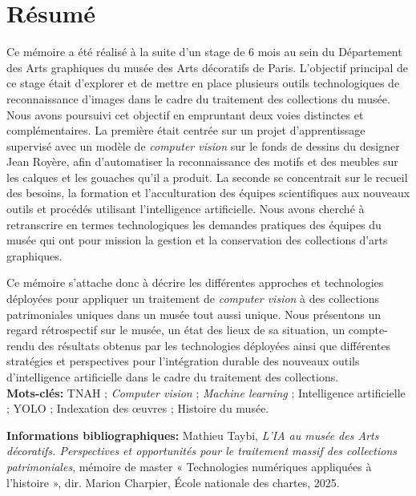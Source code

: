 \documentclass[12pt,twoside]{book}
\begin{document}
	\chapter{Résumé}
\medskip
	Ce mémoire a été réalisé à la suite d'un stage de 6 mois au sein du Département des Arts graphiques du musée des Arts décoratifs de Paris. L'objectif principal de ce stage était d'explorer et de mettre en place plusieurs outils technologiques de reconnaissance d'images dans le cadre du traitement des collections du musée. Nous avons poursuivi cet objectif en empruntant deux voies distinctes et complémentaires. La première était centrée sur un projet d'apprentissage supervisé avec un modèle de \textit{computer vision} sur le fonds de dessins du designer Jean Royère, afin d'automatiser la reconnaissance des motifs et des meubles sur les calques et les gouaches qu'il a produit. La seconde se concentrait sur le recueil des besoins, la formation et l'acculturation des équipes scientifiques aux nouveaux outils et procédés utilisant l'intelligence artificielle. Nous avons cherché à retranscrire en termes technologiques les demandes pratiques des équipes du musée qui ont pour mission la gestion et la conservation des collections d'arts graphiques. 
    
    Ce mémoire s'attache donc à décrire les différentes approches et technologies déployées pour appliquer un traitement de \textit{computer vision} à des collections patrimoniales uniques dans un musée tout aussi unique. Nous présentons un regard rétrospectif sur le musée, un état des lieux de sa situation, un compte-rendu des résultats obtenus par les technologies déployées ainsi que différentes stratégies et perspectives pour l'intégration durable des nouveaux outils d'intelligence artificielle dans le cadre du traitement des collections. \\
	
	\textbf{Mots-clés:} TNAH ; \textit{Computer vision} ; \textit{Machine learning} ; Intelligence artificielle ; YOLO ; Indexation des œuvres ; Histoire du musée.
    

	\textbf{Informations bibliographiques:} Mathieu Taybi, \textit{L'IA au musée des Arts décoratifs. Perspectives et opportunités pour le traitement massif des collections patrimoniales}, mémoire de master « Technologies numériques appliquées à l'histoire », dir. Marion Charpier, École nationale des chartes, 2025.

\end{document}
